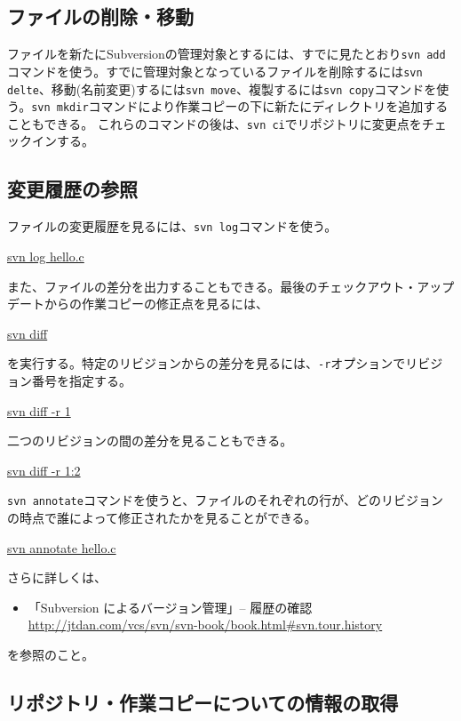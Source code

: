 \subsection{ファイルの削除・移動}

ファイルを新たにSubversionの管理対象とするには、すでに見たとおり{\tt svn add}コマンドを使う。すでに管理対象となっているファイルを削除するには{\tt svn delte}、移動(名前変更)するには{\tt svn move}、複製するには{\tt svn copy}コマンドを使う。{\tt svn mkdir}コマンドにより作業コピーの下に新たにディレクトリを追加することもできる。
これらのコマンドの後は、{\tt svn ci}でリポジトリに変更点をチェックインする。

\subsection{変更履歴の参照}

ファイルの変更履歴を見るには、{\tt svn log}コマンドを使う。
\begin{commandline2}
\prompt \underline{svn log hello.c}
\end{commandline2} \noindent
また、ファイルの差分を出力することもできる。最後のチェックアウト・アップデートからの作業コピーの修正点を見るには、
\begin{commandline2}
\prompt \underline{svn diff}
\end{commandline2} \noindent
を実行する。特定のリビジョンからの差分を見るには、{\tt -r}オプションでリビジョン番号を指定する。
\begin{commandline2}
\prompt \underline{svn diff -r 1}
\end{commandline2} \noindent
二つのリビジョンの間の差分を見ることもできる。
\begin{commandline2}
\prompt \underline{svn diff -r 1:2}
\end{commandline2} \noindent
{\tt svn annotate}コマンドを使うと、ファイルのそれぞれの行が、どのリビジョンの時点で誰によって修正されたかを見ることができる。
\begin{commandline2}
\prompt \underline{svn annotate hello.c}
\end{commandline2} \noindent
さらに詳しくは、
\begin{itemize}
  \item 「Subversion によるバージョン管理」-- 履歴の確認 \\
    \url{http://jtdan.com/vcs/svn/svn-book/book.html#svn.tour.history}
\end{itemize}
を参照のこと。

\subsection{リポジトリ・作業コピーについての情報の取得}

